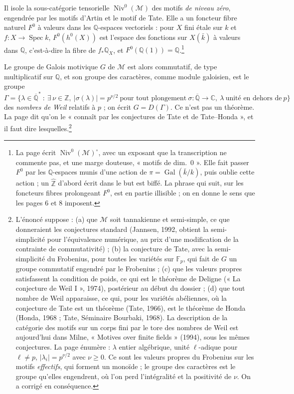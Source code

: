 \documentclass[11pt,a4paper]{article}
\begin{document}
Il isole la sous-catégorie tensorielle $\operatorname{Niv}^{0}(\mathcal{M})$ des
motifs \emph{de niveau zéro}, engendrée par les motifs d'Artin et le motif de
Tate. Elle a un foncteur fibre naturel $F^{0}$ à valeurs dans les
$\mathbb{Q}$-espaces vectoriels : pour $X$ fini étale sur $k$ et $f \colon X \to
\operatorname{Spec} k$, $F^{0}(h^{0}(X))$ est l'espace des fonctions sur
$X(\bar{k})$ à valeurs dans $\mathbb{Q}$, c'est-à-dire la fibre de
$f_{*}\mathbb{Q}_{X}$, et $F^{0}(\mathbb{Q}(1)) = \mathbb{Q}$.\footnote{La page
écrit $\operatorname{Niv}^{0}(\mathcal{M})^{\circ}$, avec un exposant que la
transcription ne commente pas, et une marge douteuse, « motifs de dim.\ 0 ».
Elle fait passer $F^{0}$ par les $\mathbb{Q}$-espaces munis d'une action de
$\pi = \operatorname{Gal}(\bar{k}/k)$, puis oublie cette action ; un
$\widehat{\mathbb{Z}}$ d'abord écrit dans le but est biffé. La phrase qui
suit, sur les foncteurs fibres prolongeant $F^{0}$, est en partie illisible ;
on en donne le sens que les pages 6 et 8 imposent.}

Le groupe de Galois motivique $G$ de $\mathcal{M}$ est alors commutatif, de
type multiplicatif sur $\mathbb{Q}$, et son groupe des caractères, comme
module galoisien, est le groupe
\[
  \Gamma = \bigl\{ \lambda \in \overline{\mathbb{Q}}^{*} \ :\ \exists\, \nu \in
  \mathbb{Z},\ |\sigma(\lambda)| = p^{\nu/2} \ \text{pour tout plongement}\
  \sigma \colon \overline{\mathbb{Q}} \to \mathbb{C},\ \lambda \ \text{unité en
  dehors de}\ p \bigr\}
\]
des \emph{nombres de Weil} relatifs à $p$ ; on écrit $G = D(\Gamma)$. Ce
n'est pas un théorème. La page dit qu'on le « connaît par les conjectures de
Tate et de Tate--Honda », et il faut dire lesquelles.\footnote{L'énoncé
suppose : (a) que $\mathcal{M}$ soit tannakienne et semi-simple, ce que
donneraient les conjectures standard (Jannsen, 1992, obtient la semi-simplicité
pour l'équivalence numérique, au prix d'une modification de la contrainte de
commutativité) ; (b) la conjecture de Tate, avec la semi-simplicité du
Frobenius, pour toutes les variétés sur $\mathbb{F}_{p}$, qui fait de $G$ un
groupe commutatif engendré par le Frobenius ; (c) que les valeurs propres
satisfassent la condition de poids, ce qui est le théorème de Deligne (« La
conjecture de Weil I », 1974), postérieur au début du dossier ; (d) que tout
nombre de Weil apparaisse, ce qui, pour les variétés abéliennes, où la
conjecture de Tate est un théorème (Tate, 1966), est le théorème de Honda
(Honda, 1968 ; Tate, Séminaire Bourbaki, 1968). La description de la catégorie
des motifs sur un corps fini par le tore des nombres de Weil est aujourd'hui
dans Milne, « Motives over finite fields » (1994), sous les mêmes conjectures.
La page énumère : $\lambda$ entier algébrique, unité $\ell$-adique pour
$\ell \neq p$, $|\lambda_{i}| = p^{\nu/2}$ avec $\nu \geqslant 0$. Ce sont les
valeurs propres du Frobenius sur les motifs \emph{effectifs}, qui forment un
monoïde ; le groupe des caractères est le groupe qu'elles engendrent, où l'on
perd l'intégralité et la positivité de $\nu$. On a corrigé en conséquence.}
\end{document}
